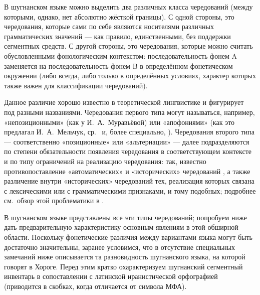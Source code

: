 В шугнанском языке можно выделить два различных класса чередований (между которыми, однако, нет абсолютно жёсткой границы). С одной стороны, это чередования, которые сами по себе являются носителями различных грамматических значений — как правило, единственными, без поддержки сегментных средств. С другой стороны, это чередования, которые можно считать обусловленными фонологическим контекстом: последовательность фонем A заменяется на последовательность фонем B в определённом фонетическом окружении (либо всегда, либо только в определённых условиях, характер которых также важен для классификации чередований).

Данное различие хорошо известно в теоретической лингвистике и фигурирует под разными названиями. Чередования первого типа могут называться, например, «непозиционными» (как у И.~А.~Муравьёвой) или «апофониями» (как это предлагал И.~А.~Мельчук, ср.~\parencite{melchuk2000} и, более специально, \parencite{melchuk1996}). Чередования второго типа — соответственно «позиционные» или «альтернации» — далее подразделяются по степени обязательности появления чередования в соответствующем контексте и по типу ограничений на реализацию чередования: так, известно противопоставление «автоматических» и «исторических» чередований \parencite{maslov1979}, а также различение внутри «исторических» чередований тех, реализация которых связана с лексическими или с грамматическими признаками, и тому подобных; подробнее см.~обзор этой проблематики в \parencite{plungian2009}.

В шугнанском языке представлены все эти типы чередований; попробуем ниже дать предварительную характеристику основным явлениям в этой обширной области. Поскольку фонетические различия между вариантами языка могут быть достаточно значительны, заранее условимся, что в отсутствие специальных замечаний ниже описывается та разновидность шугнанского языка, на которой говорят в Хороге. Перед этим кратко охарактеризуем шугнанский сегментный инвентарь в сопоставлении с латинской иранистической орфографией (приводится в скобках, когда отличается от символа МФА).

